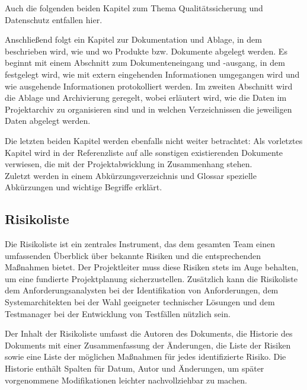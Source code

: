 Auch die folgenden beiden Kapitel zum Thema Qualitätssicherung und Datenschutz entfallen hier.

Anschließend folgt ein Kapitel zur Dokumentation und Ablage, in dem beschrieben wird, wie und wo Produkte 
bzw. Dokumente abgelegt werden. Es beginnt mit einem Abschnitt zum Dokumenteneingang und -ausgang, in dem 
festgelegt wird, wie mit extern eingehenden Informationen umgegangen wird und wie ausgehende Informationen 
protokolliert werden. Im zweiten Abschnitt wird die Ablage und Archivierung geregelt, wobei erläutert wird, 
wie die Daten im Projektarchiv zu organisieren sind und in welchen Verzeichnissen die jeweiligen Daten 
abgelegt werden.

Die letzten beiden Kapitel werden ebenfalls nicht weiter betrachtet:
Als vorletztes Kapitel wird in der Referenzliste auf alle sonstigen existierenden Dokumente verwiesen, 
die mit der Projektabwicklung in Zusammenhang stehen.\\
Zuletzt werden in einem Abkürzungsverzeichnis und Glossar spezielle Abkürzungen und wichtige Begriffe erklärt.

\subsection{Risikoliste}  \label{Risikoliste}

Die Risikoliste ist ein zentrales Instrument, das dem gesamten Team einen umfassenden Überblick über bekannte Risiken 
und die entsprechenden Maßnahmen bietet. Der Projektleiter muss diese Risiken stets im Auge behalten, um eine 
fundierte Projektplanung sicherzustellen. Zusätzlich kann die Risikoliste dem Anforderungsanalysten bei der 
Identifikation von Anforderungen, dem Systemarchitekten bei der Wahl geeigneter technischer Lösungen und dem 
Testmanager bei der Entwicklung von Testfällen nützlich sein.

Der Inhalt der Risikoliste umfasst die Autoren des Dokuments, die Historie des Dokuments mit einer Zusammenfassung 
der Änderungen, die Liste der Risiken sowie eine Liste der möglichen Maßnahmen für jedes identifizierte Risiko. 
Die Historie enthält Spalten für Datum, Autor und Änderungen, um später vorgenommene Modifikationen leichter 
nachvollziehbar zu machen.

